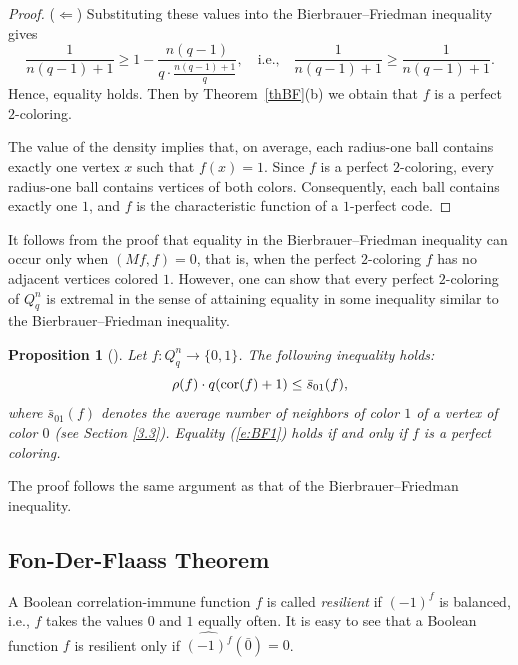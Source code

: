 \documentclass[11pt]{article}
\newtheorem{claim}{Proposition}[section]
\theoremstyle{definition}
\newcommand{\cor}{{\rm cor}}
\begin{document}
{{{\begin{proof}
    ($\Leftarrow$) Substituting these values into the Bierbrauer--Friedman inequality gives
       \[
    \frac{1}{n(q-1)+1}\ge 1-\frac{n(q-1)}{q\cdot
    \frac{n(q-1)+1}{q}}, \quad \mbox{i.e.,}   \quad  
    \frac{1}{n(q-1)+1}\ge \frac{1}{n(q-1)+1}.
    \]
    Hence, equality holds.
    Then by Theorem~\ref{thBF}(b)
    we obtain that $f$ is a perfect $2$-coloring.

    
    The value of the density implies that, on average, each radius-one ball contains exactly one vertex $x$ such that $f(x)=1$.
        Since $f$ is a perfect $2$-coloring, every radius-one ball contains vertices of both colors.
    Consequently, each ball contains exactly one $1$, and $f$ is the characteristic function of a $1$-perfect code. %
\end{proof}

It follows from the proof that equality in the Bierbrauer--Friedman inequality can occur only when
$(Mf,f)=0$, that is, when the perfect $2$-coloring $f$ has no adjacent vertices colored $1$.
However, one can show that every perfect $2$-coloring
of $Q^n_q$ is extremal in the sense of attaining
equality in some inequality similar to the
Bierbrauer--Friedman inequality.

\begin{claim}[\cite{Pot12}]
    Let $f:Q_q^n\rightarrow \{0,1\}$. The following inequality holds:
    \begin{equation}\label{e:BF1}
    \rho(f)\cdot q(\cor(f)+1)\le \bar s_{01}(f),
    \end{equation}
    where
$\bar s_{01}(f)$  denotes the average number of neighbors of color $1$ of a vertex of color $0$ (see Section \ref{3.3}). Equality
(\ref{e:BF1}) holds if and only if $f$
is a perfect coloring.
\end{claim}


The proof follows the same argument as that of the Bierbrauer--Friedman inequality.


\subsection{Fon-Der-Flaass Theorem}\label{11.6}

    A Boolean correlation-immune function $f$ is called
    {\sl resilient} if $(-1)^f$ is balanced,
    i.e., $f$ takes the values  $0$ and $1$ equally often.
It is easy to see that a Boolean function $f$ is resilient only if $\widehat{(-1)^f}(\bar{0})=0$.

}}}
\end{document}
